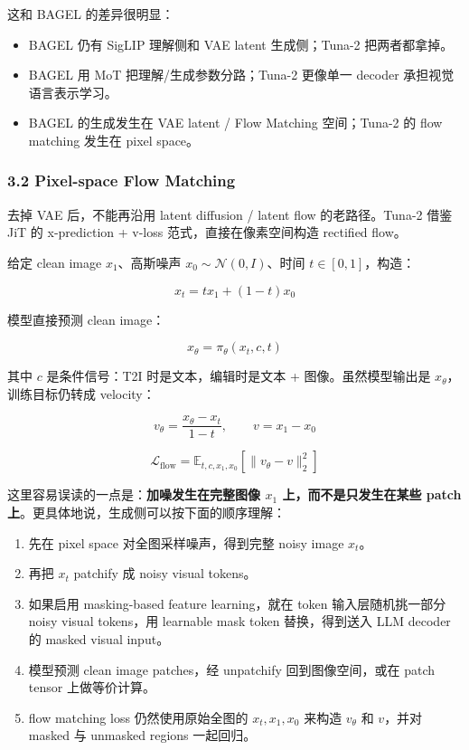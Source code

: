 这和 BAGEL 的差异很明显：

\begin{itemize}[leftmargin=1.5em]
  \item BAGEL 仍有 SigLIP 理解侧和 VAE latent 生成侧；Tuna-2 把两者都拿掉。
  \item BAGEL 用 MoT 把理解/生成参数分路；Tuna-2 更像单一 decoder 承担视觉语言表示学习。
  \item BAGEL 的生成发生在 VAE latent / Flow Matching 空间；Tuna-2 的 flow matching 发生在 pixel space。
\end{itemize}

\subsubsection{3.2 Pixel-space Flow Matching}

去掉 VAE 后，不能再沿用 latent diffusion / latent flow 的老路径。Tuna-2 借鉴 JiT 的 x-prediction + v-loss 范式，直接在像素空间构造 rectified flow。

给定 clean image \(x_1\)、高斯噪声 \(x_0 \sim \mathcal{N}(0,I)\)、时间 \(t \in [0,1]\)，构造：

\[
x_t = t x_1 + (1-t)x_0
\]

模型直接预测 clean image：

\[
x_\theta = \pi_\theta(x_t, c, t)
\]

其中 \(c\) 是条件信号：T2I 时是文本，编辑时是文本 + 图像。虽然模型输出是 \(x_\theta\)，训练目标仍转成 velocity：

\[
v_\theta = \frac{x_\theta - x_t}{1-t}, \qquad v = x_1 - x_0
\]

\[
\mathcal{L}_{\mathrm{flow}} =
\mathbb{E}_{t,c,x_1,x_0}\left[\|v_\theta - v\|_2^2\right]
\]

这里容易误读的一点是：\textbf{加噪发生在完整图像 \(x_1\) 上，而不是只发生在某些 patch 上}。更具体地说，生成侧可以按下面的顺序理解：

\begin{enumerate}[leftmargin=1.5em]
  \item 先在 pixel space 对全图采样噪声，得到完整 noisy image \(x_t\)。
  \item 再把 \(x_t\) patchify 成 noisy visual tokens。
  \item 如果启用 masking-based feature learning，就在 token 输入层随机挑一部分 noisy visual tokens，用 learnable mask token 替换，得到送入 LLM decoder 的 masked visual input。
  \item 模型预测 clean image patches，经 unpatchify 回到图像空间，或在 patch tensor 上做等价计算。
  \item flow matching loss 仍然使用原始全图的 \(x_t,x_1,x_0\) 来构造 \(v_\theta\) 和 \(v\)，并对 masked 与 unmasked regions 一起回归。
\end{enumerate}

